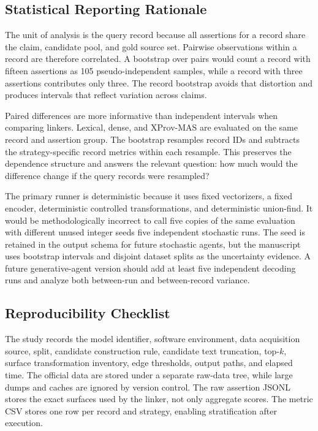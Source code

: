 \documentclass{ieeeaccess}
\begin{document}
\subsection{Statistical Reporting Rationale}
The unit of analysis is the query record because all assertions for a record share the claim, candidate pool, and gold source set. Pairwise observations within a record are therefore correlated. A bootstrap over pairs would count a record with fifteen assertions as 105 pseudo-independent samples, while a record with three assertions contributes only three. The record bootstrap avoids that distortion and produces intervals that reflect variation across claims.

Paired differences are more informative than independent intervals when comparing linkers. Lexical, dense, and XProv-MAS are evaluated on the same record and assertion group. The bootstrap resamples record IDs and subtracts the strategy-specific record metrics within each resample. This preserves the dependence structure and answers the relevant question: how much would the difference change if the query records were resampled?

The primary runner is deterministic because it uses fixed vectorizers, a fixed encoder, deterministic controlled transformations, and deterministic union-find. It would be methodologically incorrect to call five copies of the same evaluation with different unused integer seeds five independent stochastic runs. The seed is retained in the output schema for future stochastic agents, but the manuscript uses bootstrap intervals and disjoint dataset splits as the uncertainty evidence. A future generative-agent version should add at least five independent decoding runs and analyze both between-run and between-record variance.

\subsection{Reproducibility Checklist}
The study records the model identifier, software environment, data acquisition source, split, candidate construction rule, candidate text truncation, top-$k$, surface transformation inventory, edge thresholds, output paths, and elapsed time. The official data are stored under a separate raw-data tree, while large dumps and caches are ignored by version control. The raw assertion JSONL stores the exact surfaces used by the linker, not only aggregate scores. The metric CSV stores one row per record and strategy, enabling stratification after execution.
\end{document}

